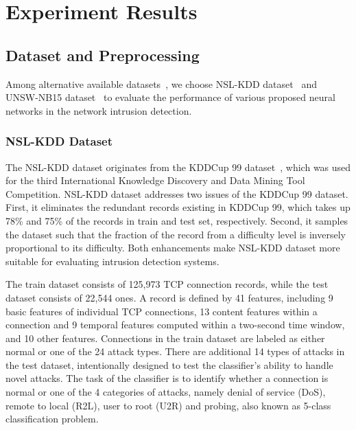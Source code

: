 \section{Experiment Results}

\subsection{Dataset and Preprocessing}

Among alternative available datasets~\cite{KDDCup, DARPA, UNSW1},
we choose NSL-KDD dataset~\cite{NSL-KDD} and UNSW-NB15 dataset~\cite{UNSW}
to evaluate the performance of various proposed neural networks in the network intrusion detection.

\subsubsection{NSL-KDD Dataset}
The NSL-KDD dataset originates from the KDDCup 99 dataset~\cite{KDDCup},
which was used for the third International Knowledge Discovery and Data Mining Tool Competition.
NSL-KDD dataset addresses two issues of the KDDCup 99 dataset.
First, it eliminates the redundant records existing in KDDCup 99, which takes up
78\% and 75\% of the records in train and test set, respectively.
Second, it samples the dataset such that the fraction of the record from a difficulty level
is inversely proportional to its difficulty.
Both enhancements make NSL-KDD dataset more suitable for
evaluating intrusion detection systems.

The train dataset consists of 125,973 TCP connection records, while the test dataset
consists of 22,544 ones.
A record is defined by 41 features, including 9 basic features of individual
TCP connections, 13 content features within a connection and 9 temporal features computed
within a two-second time window, and 10 other features.
Connections in the train dataset are labeled as either normal or one of the 24 attack
types.
There are additional 14 types of attacks in the test dataset, intentionally designed to
test the classifier's ability to handle novel attacks.
The task of the classifier is to identify whether a connection is normal or one of the
4 categories of attacks, namely denial of service (DoS), remote to local (R2L), user to
root (U2R) and probing, also known as 5-class classification problem.

